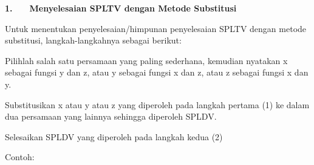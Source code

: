 \documentclass[11pt,fleqn]{book} %
\begin{document}
\par
\vspace{12pt}
\textbf{1.} $  $ $  $ $  $ $  $ $  $ $  $\textbf{Menyelesaian SPLTV dengan Metode Substitusi} \par
\noindent 
Untuk menentukan penyelesaian/himpunan penyelesaian SPLTV dengan metode substitusi, langkah-langkahnya sebagai berikut: \par
\noindent 
\begin{myEnumerate}
	\item Pilihlah salah satu persamaan yang paling sederhana, kemudian nyatakan x sebagai fungsi y dan z, atau y sebagai fungsi x dan z, atau z sebagai fungsi x dan y. \par
	\noindent 
	\item Substitusikan x atau y atau z yang diperoleh pada langkah pertama (1) ke dalam dua persamaan yang lainnya sehingga diperoleh SPLDV. \par
	\noindent 
	\item Selesaikan SPLDV yang diperoleh pada langkah kedua (2)\end{myEnumerate}
\par
\noindent 
Contoh: \par
\noindent 
\end{document}
